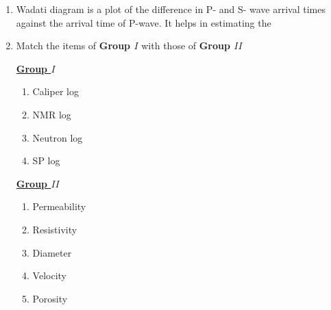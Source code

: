 \documentclass[journal,12pt,onecolumn]{IEEEtran}
\theoremstyle{remark}
\begin{document}
\begin{enumerate}[start = 26 ]
        \item Wadati diagram is a plot of the difference in P- and S- wave arrival times against the arrival time of P-wave. It helps in estimating the \hfill{}
            \begin{enumerate}
            \end{enumerate}
        
        \item Match the items of \textbf{Group $I$} with those of \textbf{Group $II$} \hfill{}
            \begin{multicols}{2}
                \underline{\textbf{Group $I$}}
                \begin{enumerate}[start = 1]
                    \item Caliper log
                    \item NMR log
                    \item Neutron log
                    \item SP log
                \end{enumerate}
                
                \columnbreak
                
                \underline{\textbf{Group $II$}}
                \begin{enumerate}
                    \item Permeability
                    \item Resistivity
                    \item Diameter
                    \item Velocity
                    \item Porosity
                \end{enumerate}
            \end{multicols}
            \begin{enumerate}
            \end{enumerate}
            

\end{enumerate}
\end{document}
